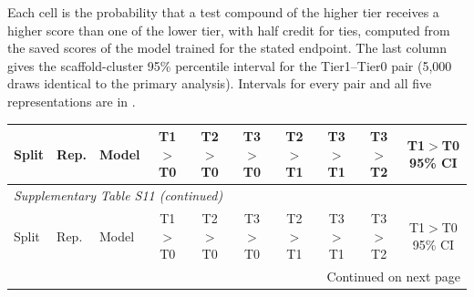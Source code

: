 Each cell is the probability that a test compound of the higher tier receives a higher score than one of the lower tier, with half credit for ties, computed from the saved scores of the model trained for the stated endpoint. The last column gives the scaffold-cluster 95\% percentile interval for the Tier1--Tier0 pair (5,000 draws identical to the primary analysis). Intervals for every pair and all five representations are in .

\begingroup\footnotesize\setlength{\tabcolsep}{3pt}

\begin{longtable}{lllccccccc}

\toprule Split & Rep. & Model & T1$>$T0 & T2$>$T0 & T3$>$T0 & T2$>$T1 & T3$>$T1 & T3$>$T2 & T1$>$T0 95\% CI \\ \midrule\endfirsthead

\multicolumn{10}{l}{\textit{Supplementary Table S11 (continued)}} \\

\toprule Split & Rep. & Model & T1$>$T0 & T2$>$T0 & T3$>$T0 & T2$>$T1 & T3$>$T1 & T3$>$T2 & T1$>$T0 95\% CI \\ \midrule\endhead

\midrule\multicolumn{10}{r}{Continued on next page}\endfoot\bottomrule\endlastfoot


\end{longtable}
